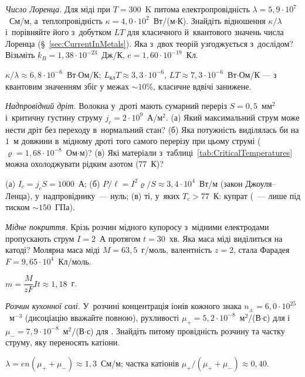 \begin{problem}\label{prb:WiedemannFranz}
	\emph{Число Лоренца.} Для міді при $T=300$~K питома електропровідність
	$\lambda=5{,}9\cdot10^{7}$~См/м, а~теплопровідність
	$\kappa=4{,}0\cdot10^{2}$~Вт/(м$\cdot$К). Знайдіть відношення $\kappa/\lambda$
	і~порівняйте його з~добутком $LT$ для класичного й~квантового значень числа Лоренца
	(\S~\ref{sec:CurrentInMetals}). Яка з~двох теорій узгоджується з~дослідом?
	Візьміть $k_B=1{,}38\cdot10^{-23}$~Дж/К, $e=1{,}60\cdot10^{-19}$~Кл.
	\begin{solution}
		$\kappa/\lambda\approx6{,}8\cdot10^{-6}$~Вт$\cdot$Ом/К; $L_{\text{кл}}T\approx3{,}3\cdot10^{-6}$, $LT\approx7{,}3\cdot10^{-6}$~Вт$\cdot$Ом/К ---
		з квантовим значенням збіг у межах $\sim10\%$, класичне вдвічі занижене.
	\end{solution}
\end{problem}

\begin{problem}\label{prb:SuperconductingWire}
	\emph{Надпровідний дріт.} Волокна  у~дроті мають сумарний переріз
	$S=0{,}5$~мм$^2$ і~критичну густину струму $j_c=2\cdot10^{9}$~А/м$^2$. (а) Який
	максимальний струм може нести дріт без переходу в~нормальний стан? (б) Яка потужність
	виділялась би на $1$~м довжини в~мідному дроті того самого перерізу при цьому струмі
	($\varrho=1{,}68\cdot10^{-8}$~Ом$\cdot$м)? (в) Які матеріали з~таблиці~\ref{tab:CriticalTemperatures}
	можна охолоджувати рідким азотом ($77$~К)?
	\begin{solution}
		(а) $I_c=j_cS=1000$~А; (б) $P/\ell=I^2\varrho/S\approx3{,}4\cdot10^{4}$~Вт/м (закон Джоуля--Ленца), у~надпровіднику~--- нуль;
		(в) ті, у~яких $T_c>77$~К: купрат  (~--- лише під тиском $\sim150$~ГПа).
	\end{solution}
\end{problem}

\begin{problem}\label{prb:ElectrolysisCopper}
	\emph{Мідне покриття.} Крізь розчин мідного купоросу  з~мідними електродами
	пропускають струм $I=2$~А протягом $t=30$~хв. Яка маса міді виділиться на катоді?
	Молярна маса міді $M=63{,}5$~г/моль, валентність $z=2$, стала Фарадея
	$F=9{,}65\cdot10^{4}$~Кл/моль.
	\begin{solution}
		$m=\dfrac{M}{zF}It\approx1{,}18$~г.
	\end{solution}
\end{problem}

\begin{problem}\label{prb:ElectrolyteConductivity}
	\emph{Розчин кухонної солі.} У~розчині  концентрація іонів кожного знака
	$n_\pm=6{,}0\cdot10^{25}$~м$^{-3}$ (дисоціацію вважайте повною), рухливості
	$\mu_+=5{,}2\cdot10^{-8}$~м$^2$/(В$\cdot$с) для \ce{Na+}
	і~$\mu_-=7{,}9\cdot10^{-8}$~м$^2$/(В$\cdot$с) для . Знайдіть питому
	провідність розчину та частку струму, яку переносять катіони.
	\begin{solution}
		$\lambda=en(\mu_++\mu_-)\approx1{,}3$~См/м; частка катіонів $\mu_+/(\mu_++\mu_-)\approx0{,}40$.
	\end{solution}
\end{problem}

